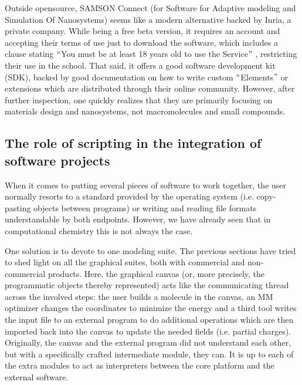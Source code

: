 Outside opensource, SAMSON Connect (for Software for Adaptive modeling and Simulation Of Nanosystems) seems like a modern alternative backed by Inria, a private company. While being a free beta version, it requires an account and accepting their terms of use just to download the software, which includes a clause stating $``$You must be at least 18 years old to use the Service$"$ , restricting their use in the school. That said, it offers a good software development kit (SDK), backed by good documentation on how to write custom $``$Elements$"$  or extensions which are distributed through their online community. However, after further inspection, one quickly realizes that they are primarily focusing on materials design and nanosystems, not macromolecules and small compounds.



\subsection{The role of scripting in the integration of software projects}
When it comes to putting several pieces of software to work together, the user normally resorts to a standard provided by the operating system (i.e. copy-pasting objects between programs) or writing and reading file formats understandable by both endpoints. However, we have already seen that in computational chemistry this is not always the case.

One solution is to devote to one modeling suite. The previous sections have tried to shed light on all the graphical suites, both with commercial and non-commercial products. Here, the graphical canvas (or, more precisely, the programmatic objects thereby represented) acts like the communicating thread across the involved steps: the user builds a molecule in the canvas, an MM optimizer changes the coordinates to minimize the energy and a third tool writes the input file to an external program to do additional operations which are then imported back into the canvas to update the needed fields (i.e. partial charges). Originally, the canvas and the external program did not understand each other, but with a specifically crafted intermediate module, they can. It is up to each of the extra modules to act as interpreters between the core platform and the external software.

